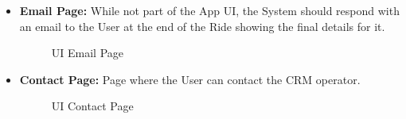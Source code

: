 \documentclass[a4paper]{article}
\begin{document}
\begin {itemize}
\item \textbf{Email Page:} While not part of the App UI, the System should respond with an email to the User at the end of the Ride showing the final details for it.
\begin{figure}[h!]
\centering
\vspace*{\fill}
\noindent{}%
\caption {UI Email Page}
\vspace*{0.2cm}
\end{figure}
\pagebreak
\item \textbf{Contact Page:} Page where the User can contact the CRM operator.
\begin{figure}[h!]
\centering
\vspace*{\fill}
\noindent{}%
\caption {UI Contact Page}
\vspace*{0.2cm}
\end{figure}
\end{itemize}
\end{document}
